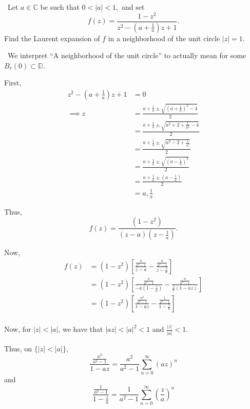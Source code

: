 \documentclass[12pt]{Qual}
\begin{document}
\begin{problem} $\,$
Let $a\in\mathbb{C}$ be such that $0<|a|<1,$ and set $$f(z)=\frac{1-z^2}{z^2-(a+\frac{1}{a})z+1}.$$ Find the Laurent expansion of $f$ in a neighborhood of the unit circle $|z|=1.$
\end{problem}


\begin{solution}$\,$
We interpret ``A neighborhood of the unit circle'' to actually mean for some $B_r(0)\subset\mathbb{D}$.

First, \begin{align*}
    z^2-(a+\frac{1}{a})z+1&=0\\
    \implies z&=\frac{a+\frac{1}{a}\pm\sqrt{(a+\frac{1}{a})^2-4}}{2}\\
    &=\frac{a+\frac{1}{a}\pm\sqrt{a^2+2+\frac{1}{a^2}-4}}{2}\\
    &=\frac{a+\frac{1}{a}\pm\sqrt{a^2-2+\frac{1}{a^2}}}{2}\\
    &=\frac{a+\frac{1}{a}\pm\sqrt{(a-\frac{1}{a})^2}}{2}\\
    &=\frac{a+\frac{1}{a}\pm(a-\frac{1}{a})}{2}\\
    &=a,\frac{1}{a}
\end{align*}

Thus, $$f(z)=\frac{(1-z^2)}{(z-a)(z-\frac{1}{a})}.$$

Now, \begin{align*}
    f(z)&=(1-z^2)\left[\frac{\frac{a}{a^2-1}}{z-a}-\frac{\frac{a}{a^2-1}}{z-\frac{1}{a}}\right]\\
    &=(1-z^2)\left[\frac{\frac{a}{a^2-1}}{-a(1-\frac{z}{a})}-\frac{\frac{a}{a^2-1}}{\frac{1}{a}(1-az)}\right]\\
    &=(1-z^2)\left[\frac{\frac{a^2}{a^2-1}}{1-az}-\frac{\frac{1}{a^2-1}}{1-\frac{z}{a}}\right]\\
\end{align*}

Now, for $|z|<|a|$, we have that $|az|<|a|^2<1$ and $\frac{|z|}{|a|}<1$.

Thus, on $\{|z|<|a|\}$, $$\frac{\frac{a^2}{a^2-1}}{1-az}=\frac{a^2}{a^2-1}\sum_{n=0}^\infty(az)^n$$ and $$\frac{\frac{1}{a^2-1}}{1-\frac{z}{a}}=\frac{1}{a^2-1}\sum_{n=0}^\infty\left(\frac{z}{a}\right)^n$$


\end{solution}
\end{document}

